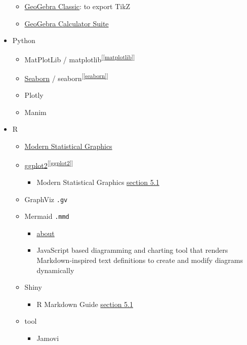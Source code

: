 \documentclass[
]{book}
\providecommand{\tightlist}{%
  \setlength{\itemsep}{0pt}\setlength{\parskip}{0pt}}
\theoremstyle{definition}
\theoremstyle{definition}
\theoremstyle{definition}
\theoremstyle{definition}
\theoremstyle{remark}
\begin{document}
\begin{itemize}
  \begin{itemize}
  \tightlist
  \item
    \href{https://www.geogebra.org/classic}{GeoGebra Classic}: to export TikZ
  \item
    \href{https://www.geogebra.org/calculator}{GeoGebra Calculator Suite}
  \end{itemize}
\item
  Python

  \begin{itemize}
  \tightlist
  \item
    MatPlotLib / matplotlib\textsuperscript{{[}\ref{matplotlib}{]}}
  \item
    \protect\hyperlink{seaborn}{Seaborn} / seaborn\textsuperscript{{[}\ref{seaborn}{]}}
  \item
    Plotly
  \item
    Manim
  \end{itemize}
\item
  R

  \begin{itemize}
  \tightlist
  \item
    \href{https://bookdown.org/xiangyun/msg/}{Modern Statistical Graphics}
  \item
    \protect\hyperlink{ggplot2}{ggplot2}\textsuperscript{{[}\ref{ggplot2}{]}}

    \begin{itemize}
    \tightlist
    \item
      Modern Statistical Graphics \href{https://bookdown.org/xiangyun/msg/system.html\#sec:ggplot2}{section 5.1}
    \end{itemize}
  \item
    GraphViz \texttt{.gv}
  \item
    Mermaid \texttt{.mmd}

    \begin{itemize}
    \tightlist
    \item
      \href{https://mermaid.js.org/intro/}{about}
    \item
      JavaScript based diagramming and charting tool that renders Markdown-inspired text definitions to create and modify diagrams dynamically
    \end{itemize}
  \item
    Shiny

    \begin{itemize}
    \tightlist
    \item
      R Markdown Guide \href{https://cosname.github.io/rmarkdown-guide/rmarkdown-interaction.html\#rmarkdown-shiny}{section 5.1}
    \end{itemize}
  \item
    tool

    \begin{itemize}
    \tightlist
    \item
      Jamovi
    \end{itemize}
  \end{itemize}
\end{itemize}
\end{document}
